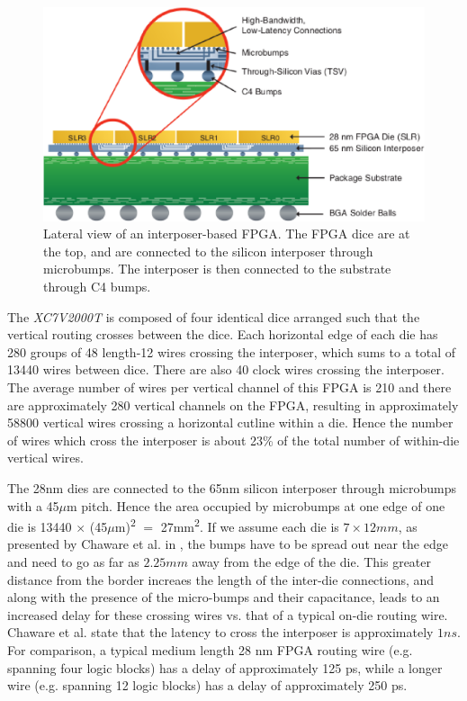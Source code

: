 \documentclass[journal]{IEEEtran}
\begin{document}
\begin{figure}[!htbp]
\centering
\includegraphics[width=\linewidth]{interposer.eps}
\caption{Lateral view of an interposer-based FPGA\cite{xilinxWP}. The FPGA dice are at the top, and are connected to the silicon interposer through microbumps. The interposer is then connected to the substrate through C4 bumps.}
\label{fig:interposer}
\end{figure}


The \textit{XC7V2000T} is composed of four identical dice arranged such that the vertical routing crosses between the dice. Each horizontal edge of each die has 280 groups of 48 length-12 wires crossing the interposer, which sums to a total of 13440 wires between dice. There are also 40 clock wires crossing the interposer. The average number of wires per vertical channel of this FPGA is 210 and there are approximately 280 vertical channels on the FPGA, resulting in approximately 58800 vertical wires crossing a horizontal cutline within a die. Hence the number of wires which cross the interposer is about 23\% of the total number of within-die vertical wires.

The 28nm dies are connected to the 65nm silicon interposer through microbumps with a 45$\mu$m pitch. Hence the area occupied by microbumps at one edge of one die is 13440 $\times$ (45$\mu$m)\textsuperscript{2} $=$ 27mm\textsuperscript{2}. If we assume each die is $7 \times 12 mm$, as presented by Chaware et al. in \cite{xilinxTSV}, the bumps have to be spread out near the edge and need to go as far as $2.25mm$ away from the edge of the die. This greater distance from the border increaes the length of the inter-die connections, and along with the presence of the micro-bumps and their capacitance, leads to an increased delay for these crossing wires vs. that of a typical on-die routing wire. Chaware et al. state that the latency to cross the interposer is approximately $1ns$. For comparison, a typical medium length 28 nm FPGA routing wire (e.g. spanning four logic blocks) has a delay of approximately 125 ps, while a longer wire (e.g. spanning 12 logic blocks) has a delay of approximately 250 ps.
\end{document}
